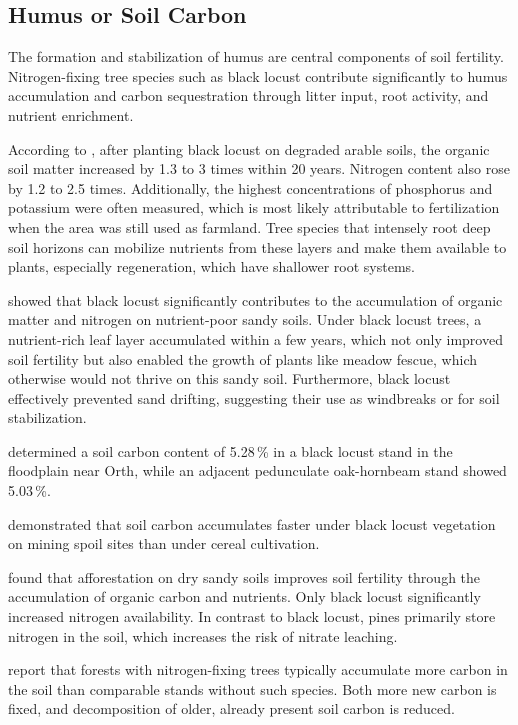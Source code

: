 \subsection{Humus or Soil Carbon}

The formation and stabilization of humus are central components of soil fertility. Nitrogen-fixing tree species such as black locust contribute significantly to humus accumulation and carbon sequestration through litter input, root activity, and nutrient enrichment.

According to \citet{papaioannou2016robinieBoden}, after planting black locust on degraded arable soils, the organic soil matter increased by 1.3 to 3 times within 20 years. Nitrogen content also rose by 1.2 to 2.5 times. Additionally, the highest concentrations of phosphorus and potassium were often measured, which is most likely attributable to fertilization when the area was still used as farmland. Tree species that intensely root deep soil horizons can mobilize nutrients from these layers and make them available to plants, especially regeneration, which have shallower root systems.

\citet{gustafson1935robinie} showed that black locust significantly contributes to the accumulation of organic matter and nitrogen on nutrient-poor sandy soils. Under black locust trees, a nutrient-rich leaf layer accumulated within a few years, which not only improved soil fertility but also enabled the growth of plants like meadow fescue, which otherwise would not thrive on this sandy soil. Furthermore, black locust effectively prevented sand drifting, suggesting their use as windbreaks or for soil stabilization.

\citet{kastler2013robinieBoden} determined a soil carbon content of 5.28\,\% in a black locust stand in the floodplain near Orth, while an adjacent pedunculate oak-hornbeam stand showed 5.03\,\%.

\citet{kanzler2021robinieBodenc} demonstrated that soil carbon accumulates faster under black locust vegetation on mining spoil sites than under cereal cultivation.

\citet{gurlevik2016longterm} found that afforestation on dry sandy soils improves soil fertility through the accumulation of organic carbon and nutrients. Only black locust significantly increased nitrogen availability. In contrast to black locust, pines primarily store nitrogen in the soil, which increases the risk of nitrate leaching.

\citet{resh2002nFixUndC} report that forests with nitrogen-fixing trees typically accumulate more carbon in the soil than comparable stands without such species. Both more new carbon is fixed, and decomposition of older, already present soil carbon is reduced.

